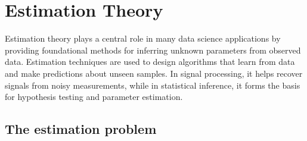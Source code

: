 \section{Estimation Theory}
\label{sec:SDT}

Estimation theory plays a central role in many data science applications by providing foundational methods for inferring unknown parameters from observed data. Estimation techniques are used to design algorithms that learn from data and make predictions about unseen samples. In signal processing, it helps recover signals from noisy measurements, while in statistical inference, it forms the basis for hypothesis testing and parameter estimation. 


\subsection{The estimation problem}
\label{subsec:hypotheses_problems}

